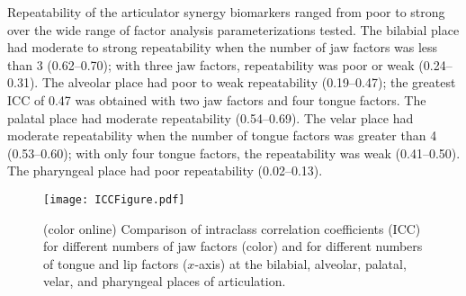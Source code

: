 \documentclass[preprint]{JASAnew}
\begin{document}
Repeatability of the articulator synergy biomarkers ranged from poor to strong over the wide range of factor analysis parameterizations tested. 
%
The bilabial place had moderate to strong repeatability when the number of jaw factors was less than \num{3} (\numrange{0.62}{0.70}); with three jaw factors, repeatability was poor or weak (\numrange{0.24}{0.31}). 
%
The alveolar place had poor to weak repeatability (\numrange{0.19}{0.47}); the greatest ICC of \num{0.47} was obtained with two jaw factors and four tongue factors.
%
The palatal place had moderate repeatability (\numrange{0.54}{0.69}). 
%
The velar place had moderate repeatability when the number of tongue factors was greater than \num{4} (\numrange{0.53}{0.60}); with only four tongue factors, the repeatability was weak (\numrange{0.41}{0.50}). 
%
The pharyngeal place had poor repeatability (\numrange{0.02}{0.13}).



\begin{figure*}
\raggedright

\texttt{[image: ICCFigure.pdf]}

\caption{(color online) Comparison of intraclass correlation coefficients (ICC) for different numbers of jaw factors (color) and for different numbers of tongue and lip factors ($x$-axis) at the bilabial, alveolar, palatal, velar, and pharyngeal places of articulation.}
\label{fig:icc_all}
\end{figure*}

\end{document}
